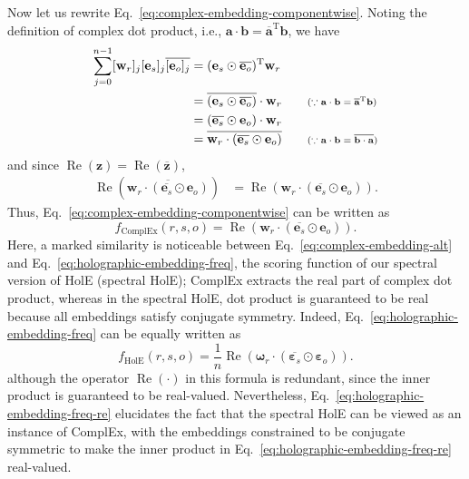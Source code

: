 \documentclass[11pt,a4paper]{article}
\def\mat#1{\boldsymbol{\mathbf{#1}}}
\def\transpose{^{\mathrm{T}}}
\let\hprod\odot
\def\RE{\mathop{\text{Re}}}
\begin{document}
Now let us rewrite Eq.~\eqref{eq:complex-embedding-componentwise}.
Noting the definition of complex dot product, i.e., $\mat{a}\cdot \mat{b} = \overline{ \mat{a} }\transpose \mat{b} $,
we have
\begin{align}
  \sum_{j=0}^{n-1} [\mat{w}_r]_j [\mat{e}_s]_j \overline{ [\mat{e}_o]_j }
  & = ( \mat{e}_s  \hprod \overline{ \mat{e}_o } )\transpose \mat{w}_r
    \notag \\
  & = \overline { ( \mat{e}_s  \hprod \overline{ \mat{e}_o }) } \cdot \mat{w}_r
    \tag*{\scriptsize ($\because \mat{a}\cdot \mat{b} = \overline{ \mat{a} }\transpose \mat{b} $)} \\
  & = ( \overline{ \mat{e}_s} \hprod            \mat{e}_o   ) \cdot \mat{w}_r
    \notag \\
  & =  \overline { \mat{w}_r \cdot ( \overline{ \mat{e}_s} \hprod            \mat{e}_o   ) }
    \tag*{\scriptsize ($\because \mat{a}\cdot\mat{b} = \overline { \mat{b} \cdot \mat{a} }$)}
\end{align}
and since $\RE(\mat{z}) = \RE(\overline{\mat{z}})$,
\begin{align*}
   \RE( \overline { \mat{w}_r \cdot ( \overline{ \mat{e}_s} \hprod \mat{e}_o ) } )  & = \RE( \mat{w}_r \cdot ( \overline{ \mat{e}_s} \hprod \mat{e}_o ) ).
\end{align*}
Thus, Eq.~\eqref{eq:complex-embedding-componentwise} can be written as
\begin{equation}
  \label{eq:complex-embedding-alt}
  f_{\text{ComplEx}}(r,s,o) = \RE \left( \mat{w}_r \cdot ( \overline{ \mat{e}_s } \hprod \mat{e}_o) \right).
\end{equation}
Here, a marked similarity is noticeable between
Eq.~\eqref{eq:complex-embedding-alt} and
Eq.~\eqref{eq:holographic-embedding-freq},
the scoring function of our spectral version of HolE (spectral HolE);
ComplEx extracts the real part of complex dot product,
whereas in the spectral HolE, dot product is guaranteed to be real
because all embeddings satisfy conjugate symmetry.
Indeed,
Eq.~\eqref{eq:holographic-embedding-freq} can be equally written as
\begin{equation}
  \label{eq:holographic-embedding-freq-re}
  f_{\text{HolE}}(r,s,o) = \frac{1}{n} \RE \left( \mat{\omega}_r \cdot ( \overline{ \mat{\varepsilon}_s } \hprod \mat{\varepsilon}_o) \right).
\end{equation}
although
the operator $\RE(\cdot)$ in this formula is redundant, since the inner product is guaranteed to be real-valued.
Nevertheless, Eq.~\eqref{eq:holographic-embedding-freq-re}
elucidates the fact that the spectral HolE can be viewed as an instance of ComplEx,
with the embeddings constrained to be conjugate symmetric to make the inner product in Eq.~\eqref{eq:holographic-embedding-freq-re} real-valued.
\end{document}
